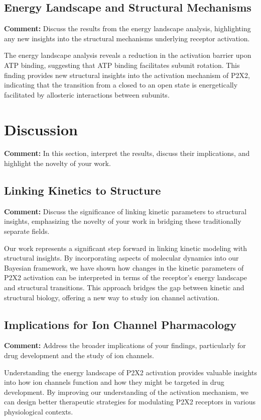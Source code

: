 \documentclass{article}
\begin{document}
	\subsection{Energy Landscape and Structural Mechanisms}
	\textbf{Comment:} Discuss the results from the energy landscape analysis, highlighting any new insights into the structural mechanisms underlying receptor activation.
	
	The energy landscape analysis reveals a reduction in the activation barrier upon ATP binding, suggesting that ATP binding facilitates subunit rotation. This finding provides new structural insights into the activation mechanism of P2X2, indicating that the transition from a closed to an open state is energetically facilitated by allosteric interactions between subunits.
	
	\section{Discussion}
	\textbf{Comment:} In this section, interpret the results, discuss their implications, and highlight the novelty of your work.
	
	\subsection{Linking Kinetics to Structure}
	\textbf{Comment:} Discuss the significance of linking kinetic parameters to structural insights, emphasizing the novelty of your work in bridging these traditionally separate fields.
	
	Our work represents a significant step forward in linking kinetic modeling with structural insights. By incorporating aspects of molecular dynamics into our Bayesian framework, we have shown how changes in the kinetic parameters of P2X2 activation can be interpreted in terms of the receptor's energy landscape and structural transitions. This approach bridges the gap between kinetic and structural biology, offering a new way to study ion channel activation.
	
	\subsection{Implications for Ion Channel Pharmacology}
	\textbf{Comment:} Address the broader implications of your findings, particularly for drug development and the study of ion channels.
	
	Understanding the energy landscape of P2X2 activation provides valuable insights into how ion channels function and how they might be targeted in drug development. By improving our understanding of the activation mechanism, we can design better therapeutic strategies for modulating P2X2 receptors in various physiological contexts.
	
\end{document}

